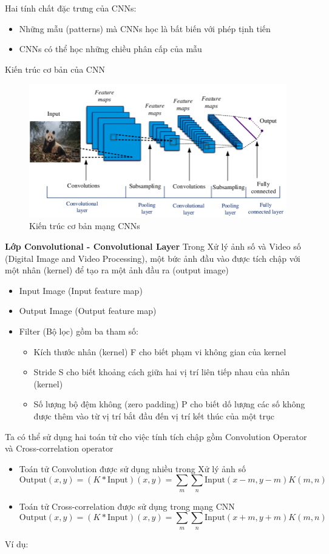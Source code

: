 \documentclass{article}
\begin{document}
	Hai tính chất đặc trưng của CNNs:
	\begin{itemize}
		\item Những mẫu (patterns) mà CNNs học là bất biến với phép tịnh tiến
		\item CNNs có thể học những chiều phân cấp của mẫu
	\end{itemize}
	Kiến trúc cơ bản của CNN
	\begin{figure}[H]
		\centering
		\includegraphics[width=0.75\linewidth]{images/An-example-of-a-simple-CNN-architecture.png}
		\caption{Kiến trúc cơ bản mạng CNNs}
		\label{fig:writing-thesis}
	\end{figure}
	\textbf{Lớp Convolutional - Convolutional Layer}
	Trong Xử lý ảnh số và Video số (Digital Image and Video Processing), một bức ảnh đầu vào được tích chập với một nhân (kernel) để tạo ra một ảnh đầu ra (output image)\newline
	\begin{itemize}
		\item Input Image (Input feature map)
		\item Output Image (Output feature map)
		\item Filter (Bộ lọc) gồm ba tham số:
		\begin{itemize}
			\item Kích thước nhân (kernel) F cho biết phạm vi không gian của kernel
			\item Stride S cho biết khoảng cách giữa hai vị trí liên tiếp nhau của nhân (kernel)
			\item Số lượng bộ đệm không (zero padding) P cho biết dố lượng các số không được thêm vào từ vị trí bắt đầu đến vị trí kết thúc của một trục
		\end{itemize}
	\end{itemize}
	Ta có thể sử dụng hai toán tử cho việc tính tích chập gồm Convolution Operator và Cross-correlation operator
	\begin{itemize}
		\item Toán tử Convolution được sử dụng nhiều trong Xử lý ảnh số
		\begin{equation}
			\text{Output}(x, y) = (K * \text{Input})(x, y) = \sum_m\sum_n\text{Input}(x-m, y-m)K(m,n)
		\end{equation}
		\item Toán tử Cross-correlation được sử dụng trong mạng CNN
		\begin{equation}
			\text{Output}(x, y) = (K * \text{Input})(x, y) = \sum_m\sum_n\text{Input}(x+m, y+m)K(m,n)
		\end{equation}
	\end{itemize}
	Ví dụ:
	
\end{document}
